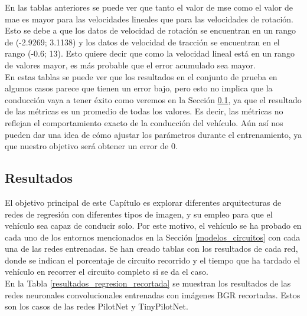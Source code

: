 En las tablas anteriores se puede ver que tanto el valor de \acrshort{mse} como el valor de \acrshort{mae} es mayor para las velocidades lineales que para las velocidades de rotación. Esto se debe a que los datos de velocidad de rotación se encuentran en un rango de (-2.9269; 3.1138) y los datos de velocidad de tracción se encuentran en el rango (-0.6; 13). Esto quiere decir que como la velocidad lineal está en un rango de valores mayor, es más probable que el error acumulado sea mayor.\\

En estas tablas se puede ver que los resultados en el conjunto de prueba en algunos casos parece que tienen un error bajo, pero esto no implica que la conducción vaya a tener éxito como veremos en la Sección \ref{resultados_regresion}, ya que el resultado de las métricas es un promedio de todas los valores. Es decir, las métricas no reflejan el comportamiento exacto de la conducción del vehículo. Aún así nos pueden dar una idea de cómo ajustar los parámetros durante el entrenamiento, ya que nuestro objetivo será obtener un error de 0.\\



\subsection{Resultados}\label{resultados_regresion}

El objetivo principal de este Capítulo es explorar diferentes arquitecturas de redes de regresión con diferentes tipos de imagen, y su empleo para que el vehículo sea capaz de conducir solo. Por este motivo, el vehículo se ha probado en cada uno de los entornos mencionados en la Sección \ref{modelos_circuitos} con cada una de las redes entrenadas. Se han creado tablas con los resultados de cada red, donde se indican el porcentaje de circuito recorrido y el tiempo que ha tardado el vehículo en recorrer el circuito completo si se da el caso.\\

En la Tabla \ref{resultados_regresion_recortada} se muestran los resultados de las redes neuronales convolucionales entrenadas con imágenes BGR recortadas. Estos son los casos de las redes PilotNet y TinyPilotNet.\\

